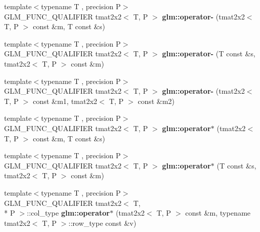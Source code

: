 \begin{DoxyCompactItemize}
\item 
\hypertarget{namespaceglm_a5714d191269fffee9f8210da088a1c5f}{{\footnotesize template$<$typename T , precision P$>$ }\\G\-L\-M\-\_\-\-F\-U\-N\-C\-\_\-\-Q\-U\-A\-L\-I\-F\-I\-E\-R tmat2x2$<$ T, P $>$ {\bfseries glm\-::operator-\/} (tmat2x2$<$ T, P $>$ const \&m, T const \&s)}\label{namespaceglm_a5714d191269fffee9f8210da088a1c5f}

\item 
\hypertarget{namespaceglm_a44fd3b02e7ef87b81118da12ba1ab113}{{\footnotesize template$<$typename T , precision P$>$ }\\G\-L\-M\-\_\-\-F\-U\-N\-C\-\_\-\-Q\-U\-A\-L\-I\-F\-I\-E\-R tmat2x2$<$ T, P $>$ {\bfseries glm\-::operator-\/} (T const \&s, tmat2x2$<$ T, P $>$ const \&m)}\label{namespaceglm_a44fd3b02e7ef87b81118da12ba1ab113}

\item 
\hypertarget{namespaceglm_a0d4974acd47ff586c5643bdf07de8a6d}{{\footnotesize template$<$typename T , precision P$>$ }\\G\-L\-M\-\_\-\-F\-U\-N\-C\-\_\-\-Q\-U\-A\-L\-I\-F\-I\-E\-R tmat2x2$<$ T, P $>$ {\bfseries glm\-::operator-\/} (tmat2x2$<$ T, P $>$ const \&m1, tmat2x2$<$ T, P $>$ const \&m2)}\label{namespaceglm_a0d4974acd47ff586c5643bdf07de8a6d}

\item 
\hypertarget{namespaceglm_ade55bbe062e1601d8426510e026e2975}{{\footnotesize template$<$typename T , precision P$>$ }\\G\-L\-M\-\_\-\-F\-U\-N\-C\-\_\-\-Q\-U\-A\-L\-I\-F\-I\-E\-R tmat2x2$<$ T, P $>$ {\bfseries glm\-::operator$\ast$} (tmat2x2$<$ T, P $>$ const \&m, T const \&s)}\label{namespaceglm_ade55bbe062e1601d8426510e026e2975}

\item 
\hypertarget{namespaceglm_aa7586349972bcef1ac08a6fa756477f9}{{\footnotesize template$<$typename T , precision P$>$ }\\G\-L\-M\-\_\-\-F\-U\-N\-C\-\_\-\-Q\-U\-A\-L\-I\-F\-I\-E\-R tmat2x2$<$ T, P $>$ {\bfseries glm\-::operator$\ast$} (T const \&s, tmat2x2$<$ T, P $>$ const \&m)}\label{namespaceglm_aa7586349972bcef1ac08a6fa756477f9}

\item 
\hypertarget{namespaceglm_a65dc9a4505d414c9c07286a793588031}{{\footnotesize template$<$typename T , precision P$>$ }\\G\-L\-M\-\_\-\-F\-U\-N\-C\-\_\-\-Q\-U\-A\-L\-I\-F\-I\-E\-R tmat2x2$<$ T, \\*
P $>$\-::col\-\_\-type {\bfseries glm\-::operator$\ast$} (tmat2x2$<$ T, P $>$ const \&m, typename tmat2x2$<$ T, P $>$\-::row\-\_\-type const \&v)}\label{namespaceglm_a65dc9a4505d414c9c07286a793588031}


\end{DoxyCompactItemize}

